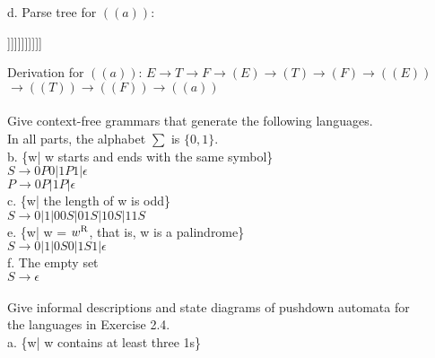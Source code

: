 \documentclass[12pt]{article}
\begin{document}
\pagebreak
\noindent
d. Parse tree for $((a))$: \\
\begin{center}
	\begin{forest}
		[E [T [F [(E) [(T) [(F) [((E)) [((T)) [((F)) [a]]]]]]]]]]]
	\end{forest}
\end{center}

\noindent
Derivation for $((a))$:  $E \rightarrow T \rightarrow F \rightarrow (E) \rightarrow (T) \rightarrow (F) \rightarrow ((E)) $  \\
$ \rightarrow ((T)) \rightarrow ((F)) \rightarrow ((a)) $ \\


\pagebreak
{} \\
Give context-free grammars that generate the following languages. \\
In all parts, the alphabet $\sum$ is $\{0,1\}$. \\

\noindent
b. \{w| w starts and ends with the same symbol\} \\
$ S \rightarrow 0P0|1P1| \epsilon $ \\
$ P \rightarrow 0P|1P| \epsilon $ \\

\noindent
c. \{w| the length of w is odd\} \\
$ S \rightarrow 0|1|00S|01S|10S|11S $ \\

\noindent
e. \{w| w = $w\textsuperscript{R}$, that is, w is a palindrome\} \\
$ S \rightarrow 0|1|0S0|1S1| \epsilon $ \\

\noindent
f. The empty set \\
$ S \rightarrow \epsilon $ \\


\pagebreak
{} \\
Give informal descriptions and state diagrams of pushdown automata for \\
the languages in Exercise 2.4. \\

\noindent
a. \{w| w contains at least three 1s\}\\
\end{document}
